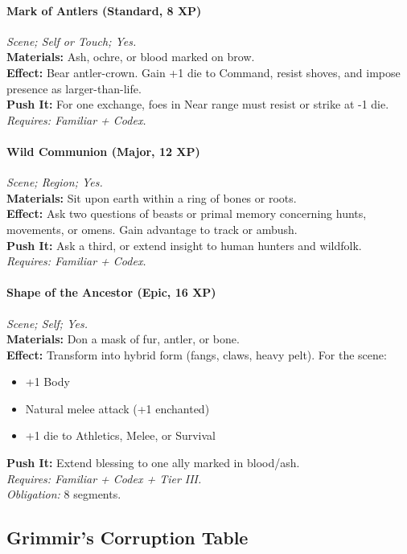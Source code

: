 \paragraph{Mark of Antlers (Standard, 8 XP)} \emph{Scene; Self or Touch; Yes.}\\
\textbf{Materials:} Ash, ochre, or blood marked on brow.\\
\textbf{Effect:} Bear antler-crown. Gain +1 die to Command, resist shoves, and impose presence as larger-than-life.\\
\textbf{Push It:} For one exchange, foes in Near range must resist or strike at -1 die.\\
\emph{Requires: Familiar + Codex.}

\paragraph{Wild Communion (Major, 12 XP)} \emph{Scene; Region; Yes.}\\
\textbf{Materials:} Sit upon earth within a ring of bones or roots.\\
\textbf{Effect:} Ask two questions of beasts or primal memory concerning hunts, movements, or omens. Gain advantage to track or ambush.\\
\textbf{Push It:} Ask a third, or extend insight to human hunters and wildfolk.\\
\emph{Requires: Familiar + Codex.}

\paragraph{Shape of the Ancestor (Epic, 16 XP)} \emph{Scene; Self; Yes.}\\
\textbf{Materials:} Don a mask of fur, antler, or bone.\\
\textbf{Effect:} Transform into hybrid form (fangs, claws, heavy pelt). For the scene:  
\begin{itemize}
  \item +1 Body  
  \item Natural melee attack (+1 enchanted)  
  \item +1 die to Athletics, Melee, or Survival  
\end{itemize}  
\textbf{Push It:} Extend blessing to one ally marked in blood/ash.\\
\emph{Requires: Familiar + Codex + Tier III.}\\
\emph{Obligation:} 8 segments.

\subsection*{Grimmir’s Corruption Table}
\label{sec:grimmir-corruption}

